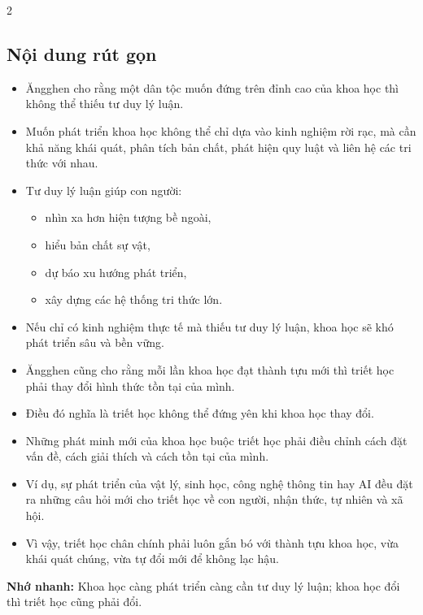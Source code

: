 \documentclass[9pt,a4paper]{extarticle}
\begin{document}
\begin{multicols*}{2}
\subsection*{Nội dung rút gọn}
\begin{itemize}
  \item Ăngghen cho rằng một dân tộc muốn đứng trên đỉnh cao của khoa học thì không thể thiếu tư duy lý luận.
  \item Muốn phát triển khoa học không thể chỉ dựa vào kinh nghiệm rời rạc, mà cần khả năng khái quát, phân tích bản chất, phát hiện quy luật và liên hệ các tri thức với nhau.
  \item Tư duy lý luận giúp con người:
  \begin{itemize}
    \item nhìn xa hơn hiện tượng bề ngoài,
    \item hiểu bản chất sự vật,
    \item dự báo xu hướng phát triển,
    \item xây dựng các hệ thống tri thức lớn.
  \end{itemize}
  \item Nếu chỉ có kinh nghiệm thực tế mà thiếu tư duy lý luận, khoa học sẽ khó phát triển sâu và bền vững.
  \item Ăngghen cũng cho rằng mỗi lần khoa học đạt thành tựu mới thì triết học phải thay đổi hình thức tồn tại của mình.
  \item Điều đó nghĩa là triết học không thể đứng yên khi khoa học thay đổi.
  \item Những phát minh mới của khoa học buộc triết học phải điều chỉnh cách đặt vấn đề, cách giải thích và cách tồn tại của mình.
  \item Ví dụ, sự phát triển của vật lý, sinh học, công nghệ thông tin hay AI đều đặt ra những câu hỏi mới cho triết học về con người, nhận thức, tự nhiên và xã hội.
  \item Vì vậy, triết học chân chính phải luôn gắn bó với thành tựu khoa học, vừa khái quát chúng, vừa tự đổi mới để không lạc hậu.
\end{itemize}

\textbf{Nhớ nhanh:} Khoa học càng phát triển càng cần tư duy lý luận; khoa học đổi thì triết học cũng phải đổi.

\end{multicols*}
\end{document}
